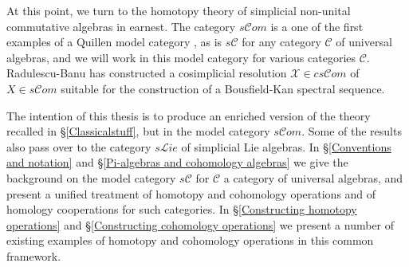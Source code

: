 \documentclass[11pt]{amsart} \renewcommand{\baselinestretch}{1.4}
\theoremstyle{plain}
\theoremstyle{definition}
\newcommand{\scrL}{\mathscr{L}}
\newcommand{\scrC}{\mathscr{C}}
\newcommand{\calx}{\mathcal{X}}
\newcommand{\calc}{\mathcal{C}}
\newcommand{\F}{\mathbb{F}}
\newcommand{\algs}{{\scrC\!\textit{om}}}
\newcommand{\liealgs}{{\scrL\!\textit{ie}}}
\newcommand{\Ftwo}{\F_2}
\begin{document}
\begin{Introduction}
At this point, we turn to the homotopy theory of simplicial non-unital commutative algebras in earnest. The category $s\algs$ is a one of the first examples of a Quillen model category \cite{QuillenHomAlg.pdf}, as is $s\calc$ for any category $\calc$ of universal algebras, and we will work in this model category for various categories $\calc$.
Radulescu-Banu \cite{Radulescu-Banu.pdf} has constructed a cosimplicial resolution $\calx\in cs\algs$ of $X\in s\algs$ suitable for the construction of a Bousfield-Kan spectral sequence.
%
%

The intention of this thesis is to produce an enriched version of the theory recalled in \S\ref{Classicalstuff}, but in the model category $s\algs$. Some of the results also pass over to the category $s\liealgs$ of simplicial Lie algebras.  
In \S\ref{Conventions and notation} and \S\ref{Pi-algebras and cohomology algebras} we give the background on the model category $s\calc$ for $\calc$ a category of universal algebras, and present a unified treatment of homotopy and cohomology operations and of homology cooperations for such categories. In \S\ref{Constructing homotopy operations} and \S\ref{Constructing cohomology operations} we present a number of existing examples of homotopy and cohomology operations in this common framework.



\end{Introduction}
\end{document}
